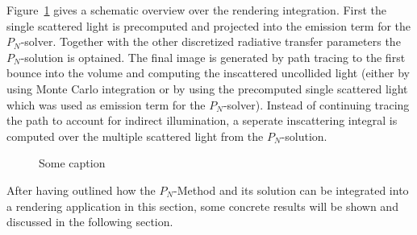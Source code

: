 Figure~\ref{fig:pn_rendering_integration_overview} gives a schematic overview over the rendering integration. First the single scattered light is precomputed and projected into the emission term for the $P_N$-solver. Together with the other discretized radiative transfer parameters the $P_N$-solution is optained. The final image is generated by path tracing to the first bounce into the volume and computing the inscattered uncollided light (either by using Monte Carlo integration or by using the precomputed single scattered light which was used as emission term for the $P_N$-solver). Instead of continuing tracing the path to account for indirect illumination, a seperate inscattering integral is computed over the multiple scattered light from the $P_N$-solution.

\begin{figure}[h]
\centering
{}
\caption{Some caption}
\label{fig:pn_rendering_integration_overview}
\end{figure}



After having outlined how the $P_N$-Method and its solution can be integrated into a rendering application in this section, some concrete results will be shown and discussed in the following section.

